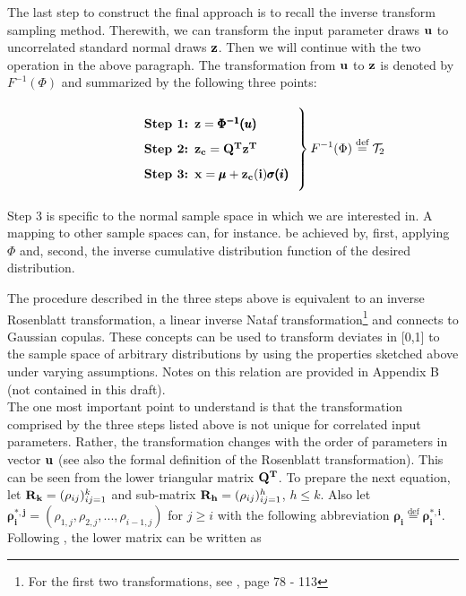 \documentclass[a4paper,12pt]{article}
\newcommand*{\defeq}{\stackrel{\text{def}}{=}}
\begin{document}
\noindent
The last step to construct the final approach is to recall the inverse transform sampling method. Therewith, we can transform the input parameter draws $\bold{u}$ to uncorrelated standard normal draws $\bold{z}$. Then we will continue with the two operation in the above paragraph. The transformation from $\bold{u}$ to $\bold{z}$ is denoted by $ F^{-1}(\Phi)$ and summarized by the following three points:


\[
\left.\parbox{0.5\textwidth}{%
\begin{enumerate}[label=\bfseries Step \arabic*:,leftmargin=*,labelindent=5em]
	\item $\bold{z} = \pmb{\Phi^{-1}({u})}$
    \item $\bold{z_c} = \bold{Q^T z^T}$
    \item $\bold{x} = \pmb{\mu} + \bold{z_c(i)}\pmb{\sigma(i)}$
\end{enumerate}
}\right\}F^{-1}(\Phi) \defeq \mathcal{T}_2
\]

Step 3 is specific to the normal sample space in which we are interested in. A mapping to other sample spaces can, for instance. be achieved by, first, applying $\Phi$ and, second, the inverse cumulative distribution function of the desired distribution.

\noindent
The procedure described in the three steps above is equivalent to an inverse Rosenblatt transformation, a linear inverse Nataf transformation\footnote{For the first two transformations, see \cite{lemaire2013structural}, page 78 - 113} and connects to Gaussian copulas. These concepts can be used to transform deviates in [0,1] to the sample space of arbitrary distributions by using the properties sketched above under varying assumptions. Notes on this relation are provided in Appendix B (not contained in this draft).\\

\noindent
The one most important point to understand is that the transformation comprised by the three steps listed above is not unique for correlated input parameters. Rather, the transformation changes with the order of parameters in vector $\bold{u}$ (see also the formal definition of the Rosenblatt transformation). This can be seen from the lower triangular matrix $\bold{Q^T}$. To prepare the next equation, let $\bold{R_k} = (\rho_{ij})_{ij=1}^k$ and sub-matrix $\bold{R_h} = (\rho_{ij})_{ij=1}^h$, $h \leq k$. Also let $\pmb{\rho_i^{*,j}} = (\rho_{1,j}, \rho_{2,j}, ..., \rho_{i-1,j})$ for $j \geq i$ with the following abbreviation $\pmb{\rho_i}\defeq\pmb{\rho_i^{*,i}}$. Following \cite{madar2015direct}, the lower matrix can be written as
\end{document}
